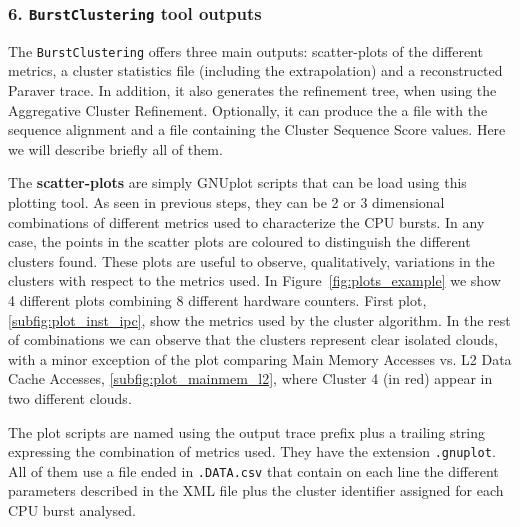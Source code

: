 \documentclass[twoside,a4,english,11pt]{book}
\begin{document}
\subsubsection*{6. \texttt{BurstClustering} tool outputs}

The \texttt{BurstClustering} offers three main outputs: scatter-plots of
the different metrics, a cluster statistics file (including the extrapolation)
and a reconstructed Paraver trace. In addition, it also generates the
refinement tree, when using the Aggregative Cluster Refinement. Optionally,
it can produce the a file with the sequence alignment and a file containing
the Cluster Sequence Score values. Here we will describe briefly all of them.

The \textbf{scatter-plots} are simply GNUplot scripts that can be load using
this plotting tool. As seen in previous steps, they can be 2 or 3 dimensional
combinations of different metrics used to characterize the CPU bursts. In any
case, the points in the scatter plots are coloured to distinguish the
different clusters found. These plots are useful to observe, qualitatively,
variations in the clusters with respect to the metrics used. In 
Figure~\ref{fig:plots_example} we show 4 different plots combining 8 different
hardware counters. First plot, \ref{subfig:plot_inst_ipc}, show the metrics
used by the cluster algorithm. In the rest of combinations we can observe that 
the clusters represent clear isolated clouds, with a minor exception of
the plot comparing Main Memory Accesses vs. L2 Data Cache Accesses,
\ref{subfig:plot_mainmem_l2}, where Cluster 4 (in red) appear in two different
clouds.

The plot scripts are named using the output trace prefix plus a trailing
string expressing the combination of metrics used. They have the extension
\texttt{.gnuplot}. All of them use a file ended in \texttt{.DATA.csv} that
contain on each line the different parameters described in the XML file plus 
the cluster identifier assigned for each CPU burst analysed.
\end{document}
